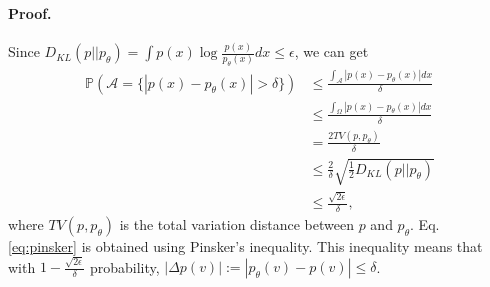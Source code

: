 \paragraph{Proof.} Since $D_{KL}(p||p_\theta)=\int p(x)\log\frac{p(x)}{p_\theta(x)}dx\leq\epsilon$, we can get
\begin{align}
\mathbb{P}(\mathcal{A}=\{|p(x)-p_\theta(x)|>\delta\})
&\leq\frac{\int_\mathcal{A}|p(x)-p_\theta(x)|dx}{\delta} \\
&\leq\frac{\int_\Omega|p(x)-p_\theta(x)|dx}{\delta}\\
&=\frac{2TV(p,p_\theta)}{\delta} \\
&\leq\frac{2}{\delta}\sqrt{\frac{1}{2}D_{KL}(p||p_\theta)} \label{eq:pinsker} \\
&\leq\frac{\sqrt{2\epsilon}}{\delta},
\end{align}
where $TV(p,p_\theta)$ is the total variation distance between $p$ and $p_\theta$. Eq. \ref{eq:pinsker} is obtained using Pinsker’s inequality. This inequality means that with $1-\frac{\sqrt{2\epsilon}}{\delta}$ probability, $|\Delta p(v)|:=|p_\theta(v)-p(v)|\leq\delta$.


